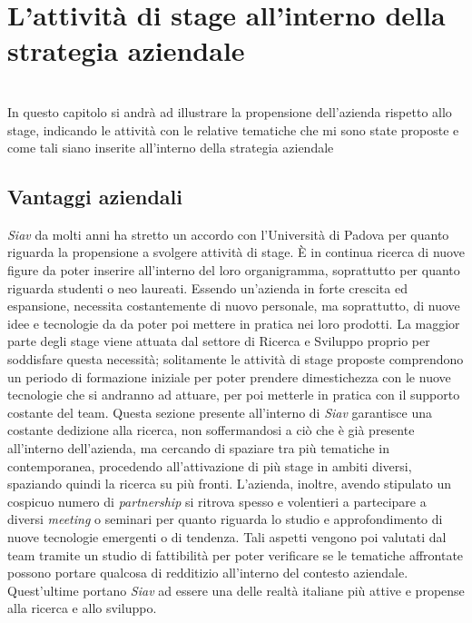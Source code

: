 
\chapter{L'attività di stage all'interno della strategia aziendale}
\label{cap:processi-metodologie}
\\
  In questo capitolo si andrà ad illustrare la propensione dell'azienda rispetto allo stage, indicando le attività con le relative tematiche che mi sono state proposte e come tali siano inserite all'interno della strategia aziendale\\

\section{Vantaggi aziendali}
\textit{Siav} da molti anni ha stretto un accordo con l'Università di Padova per quanto riguarda la propensione a svolgere attività di stage. È in continua ricerca di nuove figure da poter inserire all'interno del loro organigramma, soprattutto per quanto riguarda studenti o neo laureati.  Essendo un'azienda in forte crescita ed espansione, necessita costantemente di nuovo personale, ma soprattutto, di nuove idee e tecnologie da da poter poi mettere in pratica nei loro prodotti. La maggior parte degli stage viene attuata dal settore di Ricerca e Sviluppo proprio per soddisfare questa necessità; solitamente le attività di stage proposte comprendono un periodo di formazione iniziale per poter prendere dimestichezza con le nuove tecnologie che si andranno ad attuare, per poi metterle in pratica con il supporto costante del team. Questa sezione presente all'interno di \textit{Siav} garantisce una costante dedizione alla ricerca, non soffermandosi a ciò che è già presente all'interno dell'azienda, ma cercando di spaziare tra più tematiche in contemporanea, procedendo all'attivazione di più stage in ambiti diversi, spaziando quindi la ricerca su più fronti. L'azienda, inoltre, avendo stipulato un cospicuo numero di \textit{partnership} si ritrova spesso e volentieri a partecipare a diversi \textit{meeting} o seminari per quanto riguarda lo studio e approfondimento di nuove tecnologie emergenti o di tendenza. Tali aspetti vengono poi valutati dal team tramite un studio di fattibilità per poter verificare se le tematiche affrontate possono portare qualcosa di redditizio all'interno del contesto aziendale. Quest'ultime portano \textit{Siav} ad essere una delle realtà italiane più attive e propense alla ricerca e allo sviluppo.

